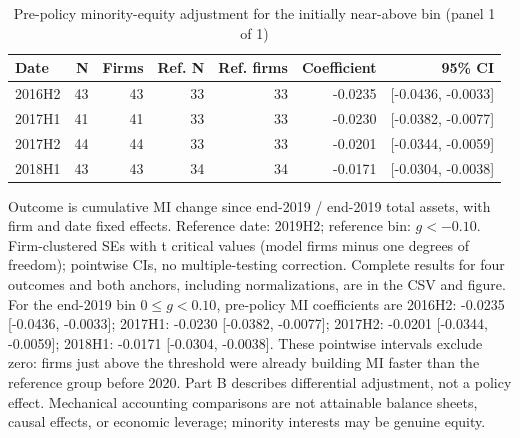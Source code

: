 \begin{table}[!htbp]\centering\scriptsize
\caption{Pre-policy minority-equity adjustment for the initially near-above bin (panel 1 of 1)}
\begin{threeparttable}
\begin{tabular}{lrrrrrr}
\toprule
Date & N & Firms & Ref. N & Ref. firms & Coefficient & 95\% CI \\
\midrule
2016H2 & 43 & 43 & 33 & 33 & -0.0235 & [-0.0436, -0.0033] \\
2017H1 & 41 & 41 & 33 & 33 & -0.0230 & [-0.0382, -0.0077] \\
2017H2 & 44 & 44 & 33 & 33 & -0.0201 & [-0.0344, -0.0059] \\
2018H1 & 43 & 43 & 34 & 34 & -0.0171 & [-0.0304, -0.0038] \\
\bottomrule
\end{tabular}
\begin{tablenotes}[flushleft]\footnotesize
\item[] Outcome is cumulative MI change since end-2019 / end-2019 total assets, with firm and date fixed effects. Reference date: 2019H2; reference bin: $g < -0.10$. Firm-clustered SEs with t critical values (model firms minus one degrees of freedom); pointwise CIs, no multiple-testing correction. Complete results for four outcomes and both anchors, including normalizations, are in the CSV and figure. For the end-2019 bin $0 \leq g < 0.10$, pre-policy MI coefficients are 2016H2: -0.0235 [-0.0436, -0.0033]; 2017H1: -0.0230 [-0.0382, -0.0077]; 2017H2: -0.0201 [-0.0344, -0.0059]; 2018H1: -0.0171 [-0.0304, -0.0038]. These pointwise intervals exclude zero: firms just above the threshold were already building MI faster than the reference group before 2020. Part B describes differential adjustment, not a policy effect. Mechanical accounting comparisons are not attainable balance sheets, causal effects, or economic leverage; minority interests may be genuine equity.
\end{tablenotes}
\end{threeparttable}
\end{table}

